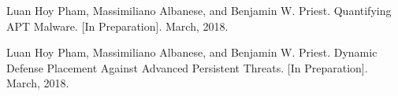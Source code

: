 \documentclass[10pt]{article}
\begin{document}
\begin{bibenum}

\item Luan Hoy Pham, Massimiliano Albanese, and Benjamin W. Priest.
Quantifying APT Malware.
[In Preparation].
March, 2018.

\item Luan Hoy Pham, Massimiliano Albanese, and Benjamin W. Priest.
Dynamic Defense Placement Against Advanced Persistent Threats.
[In Preparation].
March, 2018.


\item {}

\item {}

\item {}

\item {}

\item {}



\end{bibenum}
\end{document}
